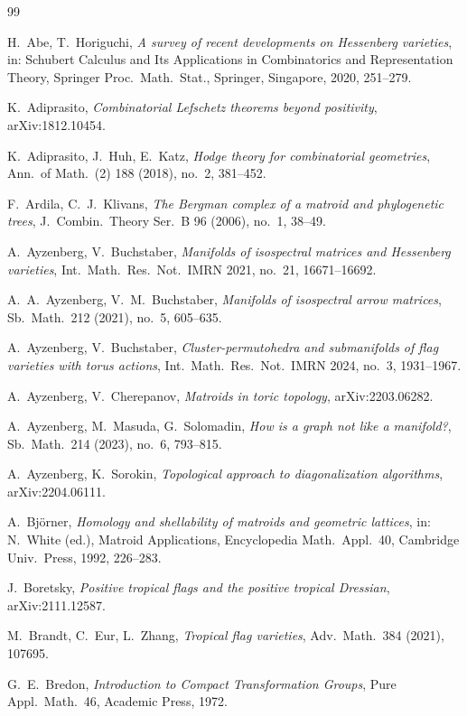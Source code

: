\documentclass[11pt,a4paper]{article}
\numberwithin{equation}{section}
\theoremstyle{plain}
\theoremstyle{definition}
\theoremstyle{remark}
\begin{document}
\begin{thebibliography}{99}\small

 H.~Abe, T.~Horiguchi, \emph{A survey of recent developments on Hessenberg varieties}, in: Schubert Calculus and Its Applications in Combinatorics and Representation Theory, Springer Proc.\ Math.\ Stat., Springer, Singapore, 2020, 251--279.

 K.~Adiprasito, \emph{Combinatorial Lefschetz theorems beyond positivity}, arXiv:1812.10454.

 K.~Adiprasito, J.~Huh, E.~Katz, \emph{Hodge theory for combinatorial geometries}, Ann.\ of Math.\ (2) 188 (2018), no.~2, 381--452.

 F.~Ardila, C.~J.~Klivans, \emph{The Bergman complex of a matroid and phylogenetic trees}, J.\ Combin.\ Theory Ser.~B 96 (2006), no.~1, 38--49.

 A.~Ayzenberg, V.~Buchstaber, \emph{Manifolds of isospectral matrices and Hessenberg varieties}, Int.\ Math.\ Res.\ Not.\ IMRN 2021, no.~21, 16671--16692.

 A.~A.~Ayzenberg, V.~M.~Buchstaber, \emph{Manifolds of isospectral arrow matrices}, Sb.\ Math.\ 212 (2021), no.~5, 605--635.

 A.~Ayzenberg, V.~Buchstaber, \emph{Cluster-permutohedra and submanifolds of flag varieties with torus actions}, Int.\ Math.\ Res.\ Not.\ IMRN 2024, no.~3, 1931--1967.

 A.~Ayzenberg, V.~Cherepanov, \emph{Matroids in toric topology}, arXiv:2203.06282.

 A.~Ayzenberg, M.~Masuda, G.~Solomadin, \emph{How is a graph not like a manifold?}, Sb.\ Math.\ 214 (2023), no.~6, 793--815.

 A.~Ayzenberg, K.~Sorokin, \emph{Topological approach to diagonalization algorithms}, arXiv:2204.06111.

 A.~Björner, \emph{Homology and shellability of matroids and geometric lattices}, in: N.~White (ed.), Matroid Applications, Encyclopedia Math.\ Appl.\ 40, Cambridge Univ.\ Press, 1992, 226--283.

 J.~Boretsky, \emph{Positive tropical flags and the positive tropical Dressian}, arXiv:2111.12587.

 M.~Brandt, C.~Eur, L.~Zhang, \emph{Tropical flag varieties}, Adv.\ Math.\ 384 (2021), 107695.

 G.~E.~Bredon, \emph{Introduction to Compact Transformation Groups}, Pure Appl.\ Math.\ 46, Academic Press, 1972.


\end{thebibliography}
\end{document}

